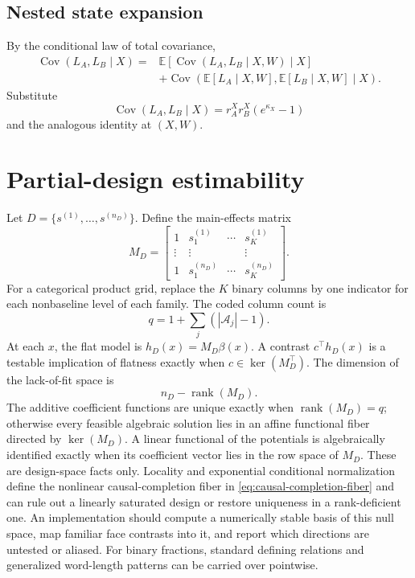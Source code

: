 \documentclass[11pt]{article}
\newcommand{\E}{\mathbb{E}}
\newcommand{\Cov}{\operatorname{Cov}}
\begin{document}
\subsection{Nested state expansion}

By the conditional law of total covariance,
\begin{align}
\Cov(L_A,L_B\mid X)
={}&
\E[\Cov(L_A,L_B\mid X,W)\mid X]\\
&+
\Cov(\E[L_A\mid X,W],\E[L_B\mid X,W]\mid X).
\end{align}
Substitute
\begin{equation}
\Cov(L_A,L_B\mid X)=r_A^Xr_B^X(e^{\kappa_X}-1)
\end{equation}
and the analogous identity at \((X,W)\).

\section{Partial-design estimability}
\label{app:partial-designs}

Let \(D=\{s^{(1)},\ldots,s^{(n_D)}\}\).  Define the main-effects matrix
\begin{equation}
M_D=
\begin{bmatrix}
1&s_1^{(1)}&\cdots&s_K^{(1)}\\
\vdots&\vdots&&\vdots\\
1&s_1^{(n_D)}&\cdots&s_K^{(n_D)}
\end{bmatrix}.
\end{equation}
For a categorical product grid, replace the \(K\) binary columns by one
indicator for each nonbaseline level of each family.  The coded column count is
\begin{equation}
q=1+\sum_j(|\mathcal A_j|-1).
\end{equation}
At each \(x\), the flat model is \(h_D(x)=M_D\beta(x)\).  A contrast \(c^\top h_D(x)\) is a testable implication of flatness exactly when \(c\in\ker(M_D^\top)\).  The dimension of the lack-of-fit space is
\begin{equation}
n_D-\operatorname{rank}(M_D).
\end{equation}
The additive coefficient functions are unique exactly when
\(\operatorname{rank}(M_D)=q\); otherwise every feasible algebraic solution
lies in an affine functional fiber directed by \(\ker(M_D)\).  A linear
functional of the potentials is algebraically identified exactly when its
coefficient vector lies in the row space of \(M_D\).  These are design-space
facts only.  Locality and exponential conditional normalization define the
nonlinear causal-completion fiber in
\eqref{eq:causal-completion-fiber} and can rule out a linearly saturated design
or restore uniqueness in a rank-deficient one.
An implementation should compute a numerically stable basis of this null space, map familiar face contrasts into it, and report which directions are untested or aliased.  For binary fractions, standard defining relations and generalized word-length patterns can be carried over pointwise.
\end{document}
